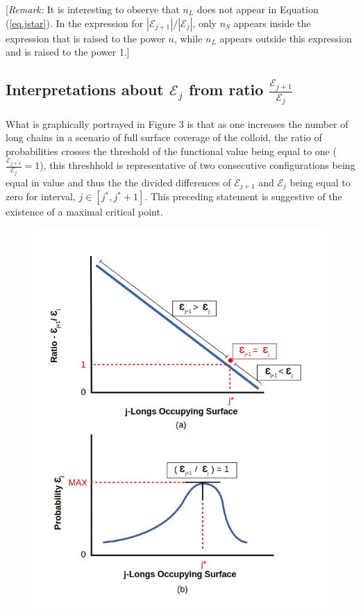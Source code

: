 \documentclass[journal=mamobx,manuscript=article]{achemso}
\begin{document}
[\textit{Remark:}  It is interesting to observe that $n_L$ does not appear in Equation (\ref{eq.jstar}).  
In the expression for $|\mathcal{E}_{j+1}|/|\mathcal{E}_j|$,   only $n_S$ appears inside the 
expression that is raised to the power $n$, while $n_L$ appears outside this expression and is
raised to the power 1.]  

\subsection{Interpretations about $\mathcal{E}_{j}$ from ratio $\frac{\mathcal{E}_{j+1}}{\mathcal{E}_{j}}$}



What is graphically portrayed in Figure 3 is that as one increases the number of long chains in a scenario of full surface coverage of the colloid, the ratio of probabilities crosses the threshold of the functional value being equal to one ($\frac{\mathcal{E}_{j+1}}{\mathcal{E}_{j}}=1$), this threshhold is representative of two consecutive configurations being equal in value and thus the the divided differences of $\mathcal{E}_{j+1}$ and $\mathcal{E}_{j}$ being equal to zero for interval,  $j\in[j^*, j^*+1]$. This preceding statement is suggestive of the existence of a maximal critical point. 

\begin{figure}[H]
\includegraphics[scale=0.50]{fig9ab.jpg}
\caption{}
\label{figure 9}
\end{figure}
\end{document}
